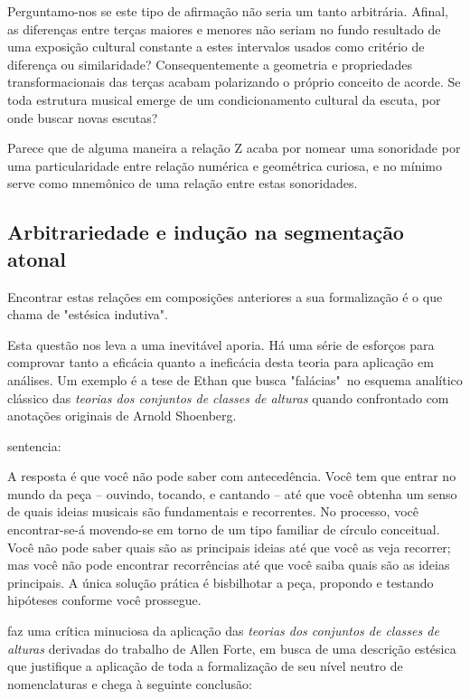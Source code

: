 \documentclass[
	12pt,				%
	openright,			%
	twoside,			%
	a4paper,			%
	english,			%
	french,				%
	spanish,			%
	brazil				%
	]{abntex2}
\begin{document}
Perguntamo-nos se este tipo de afirmação não seria um tanto arbitrária. Afinal, as diferenças entre terças maiores e menores não seriam no fundo resultado de uma exposição cultural constante a estes intervalos usados como critério de diferença ou similaridade? Consequentemente a geometria e propriedades transformacionais das terças acabam polarizando o próprio conceito de acorde. Se toda estrutura musical emerge de um condicionamento cultural da escuta, por onde buscar novas escutas?

Parece que de alguma maneira a relação Z acaba por nomear uma sonoridade por uma particularidade entre relação numérica e geométrica curiosa, e no mínimo serve como mnemônico de uma relação entre estas sonoridades.

\subsection{Arbitrariedade e indução  na segmentação atonal}

Encontrar estas relações em composições anteriores a sua formalização é o que  chama de "estésica indutiva".

Esta questão nos leva a uma inevitável aporia. Há uma série de esforços para comprovar tanto a eficácia quanto a ineficácia desta teoria para aplicação em análises. Um exemplo é a tese de Ethan  que busca "falácias"\ no esquema analítico clássico das \textit{teorias dos conjuntos de classes de alturas} quando confrontado com anotações originais de Arnold Shoenberg.

 sentencia:

\begin{citacao}
A resposta é que você não pode saber com antecedência.
Você tem que entrar no mundo da peça – ouvindo, tocando, e cantando – até que você
obtenha um senso de quais ideias musicais são fundamentais e recorrentes. No processo,
você encontrar-se-á movendo-se em torno de um tipo familiar de círculo conceitual. Você
não pode saber quais são as principais ideias até que você as veja recorrer; mas você não
pode encontrar recorrências até que você saiba quais são as ideias principais. A única
solução prática é bisbilhotar a peça, propondo e testando hipóteses conforme você
prossegue. 
\cite{straus2004}
\end{citacao}

 faz uma crítica minuciosa da aplicação das \textit{teorias dos conjuntos de classes de alturas} derivadas do trabalho de Allen Forte, em busca de uma descrição estésica que justifique a aplicação de toda a formalização de seu nível neutro de nomenclaturas e chega à seguinte conclusão:
\end{document}
